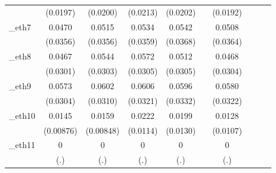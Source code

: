 \begin{table}[htbp]
\begin{tabular}{l*{9}{c}}
            &    (0.0197)         &    (0.0200)         &    (0.0213)         &    (0.0202)         &                     &    (0.0192)         &                     &                     &                     \\
[1em]
\_eth7       &      0.0470         &      0.0515         &      0.0534         &      0.0542         &                     &      0.0508         &                     &                     &                     \\
            &    (0.0356)         &    (0.0356)         &    (0.0359)         &    (0.0368)         &                     &    (0.0364)         &                     &                     &                     \\
[1em]
\_eth8       &      0.0467         &      0.0544\sym{*}  &      0.0572\sym{*}  &      0.0512\sym{*}  &                     &      0.0468         &                     &                     &                     \\
            &    (0.0301)         &    (0.0303)         &    (0.0305)         &    (0.0305)         &                     &    (0.0304)         &                     &                     &                     \\
[1em]
\_eth9       &      0.0573\sym{*}  &      0.0602\sym{*}  &      0.0606\sym{*}  &      0.0596\sym{*}  &                     &      0.0580\sym{*}  &                     &                     &                     \\
            &    (0.0304)         &    (0.0310)         &    (0.0321)         &    (0.0332)         &                     &    (0.0322)         &                     &                     &                     \\
[1em]
\_eth10      &      0.0145\sym{*}  &      0.0159\sym{*}  &      0.0222\sym{*}  &      0.0199         &                     &      0.0128         &                     &                     &                     \\
            &   (0.00876)         &   (0.00848)         &    (0.0114)         &    (0.0130)         &                     &    (0.0107)         &                     &                     &                     \\
[1em]
\_eth11      &           0         &           0         &           0         &           0         &                     &           0         &                     &                     &                     \\
            &         (.)         &         (.)         &         (.)         &         (.)         &                     &         (.)         &                     &                     &                     \\

\end{tabular}
\end{table}
